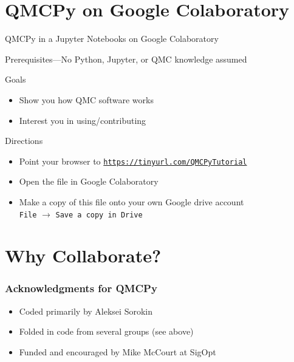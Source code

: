 \documentclass[11pt,compress,xcolor={usenames,dvipsnames},aspectratio=169]{beamer}
\begin{document}
\section{QMCPy on Google Colaboratory}
\begin{frame}{QMCPy in a Jupyter Notebooks on Google Colaboratory}
	
	\alert{Prerequisites}---No Python, Jupyter, or QMC knowledge assumed
	
	\alert{Goals}
	
		\vspace{-3ex}
		\begin{itemize}
		\item Show you how QMC software works
		\item Interest you in using/contributing
	\end{itemize}
	
	\alert{Directions}
	
	\vspace{-3ex}
	\begin{itemize}
		\item Point your browser to \href{https://tinyurl.com/QMCPyTutorial}{\nolinkurl{https://tinyurl.com/QMCPyTutorial}}
		\item Open the file in Google Colaboratory
		\item Make a copy of this file onto your own Google drive account \\
		\texttt{File} $\rightarrow$ \texttt{Save a copy in Drive}
	\end{itemize}
\end{frame}

\section{Why Collaborate?}

\begin{frame}
	\frametitle{Acknowledgments for QMCPy}
	
	\begin{itemize}
		\item Coded primarily by Aleksei Sorokin 
		
		\item Folded in code from several groups (see above)
		
		\item Funded and encouraged by Mike McCourt at SigOpt
	\end{itemize}
\end{frame}
\end{document}
